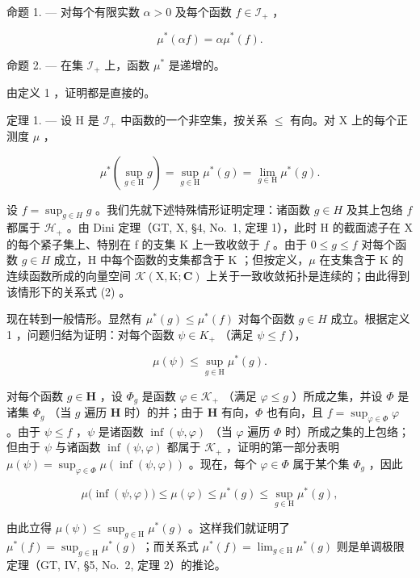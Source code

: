 命题 1. --- 对每个有限实数 \(\alpha > 0\) 及每个函数 \(f \in \mathcal{I}_{+}\) ，

\[
\mu^ {*} (\alpha f) = \alpha \mu^ {*} (f).\tag{1}
\]

命题 2. --- 在集 \(\mathcal{I}_{+}\) 上，函数 \(\mu^{*}\) 是递增的。

由定义 1 ，证明都是直接的。

定理 1. --- 设 H 是 \(\mathcal{I}_{+}\) 中函数的一个非空集，按关系 \(\leqslant\) 有向。对 X 上的每个正测度 \(\mu\) ，

\[
\mu^ {*} \left(\sup _ {g \in \mathrm{H}} g\right) = \sup _ {g \in \mathrm{H}} \mu^ {*} (g) = \lim _ {g \in \mathrm{H}} \mu^ {*} (g).\tag{2}
\]

设 \(f = \sup_{g \in H} g\) 。我们先就下述特殊情形证明定理：诸函数 \(g \in H\) 及其上包络 \(f\) 都属于 \(\mathcal{H}_+\) 。由 Dini 定理（GT, X, §4, No.~1, 定理 1），此时 H 的截面滤子在 X 的每个紧子集上、特别在 f 的支集 K 上一致收敛于 \(f\) 。由于 \(0 \leqslant g \leqslant f\) 对每个函数 \(g \in H\) 成立，H 中每个函数的支集都含于 K ；但按定义，\(\mu\) 在支集含于 K 的连续函数所成的向量空间 \(\mathcal{K}(\mathrm{X},\mathrm{K};\mathbf{C})\) 上关于一致收敛拓扑是连续的；由此得到该情形下的关系式 (2) 。

现在转到一般情形。显然有 \(\mu^{*}(g) \leqslant \mu^{*}(f)\) 对每个函数 \(g \in H\) 成立。根据定义 1 ，问题归结为证明：对每个函数 \(\psi \in K_{+}\) （满足 \(\psi \leqslant f\) ），

\[
\mu (\psi) \leqslant \sup _ {g \in \mathrm{H}} \mu^ {*} (g).
\]

对每个函数 \(g \in \mathbf{H}\) ，设 \(\Phi_g\) 是函数 \(\varphi \in \mathcal{K}_+\) （满足 \(\varphi \leqslant g\) ）所成之集，并设 \(\Phi\) 是诸集 \(\Phi_g\) （当 \(g\) 遍历 \(\mathbf{H}\) 时）的并；由于 \(\mathbf{H}\) 有向，\(\Phi\) 也有向，且 \(f = \sup_{\varphi \in \Phi} \varphi\) 。由于 \(\psi \leqslant f\) ，\(\psi\) 是诸函数 \(\inf(\psi, \varphi)\) （当 \(\varphi\) 遍历 \(\Phi\) 时）所成之集的上包络；但由于 \(\psi\) 与诸函数 \(\inf(\psi, \varphi)\) 都属于 \(\mathcal{K}_+\) ，证明的第一部分表明 \(\mu(\psi) = \sup_{\varphi \in \Phi} \mu(\inf(\psi, \varphi))\) 。现在，每个 \(\varphi \in \Phi\) 属于某个集 \(\Phi_g\) ，因此

\[
\mu \big (\inf (\psi , \varphi) \big) \leqslant \mu (\varphi) \leqslant \mu^ {*} (g) \leqslant \sup _ {g \in \mathrm{H}} \mu^ {*} (g),
\]

由此立得 \(\mu(\psi) \leqslant \sup_{g \in \mathrm{H}} \mu^{*}(g)\) 。这样我们就证明了 \(\mu^{*}(f) = \sup_{g \in \mathrm{H}} \mu^{*}(g)\) ；而关系式 \(\mu^{*}(f) = \lim_{g \in \mathrm{H}} \mu^{*}(g)\) 则是单调极限定理（GT, IV, §5, No.~2, 定理 2）的推论。


